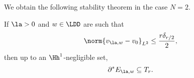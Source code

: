 We obtain the following stability theorem in the case $N=2$.


\begin{thm}
 If $\la>0$ and $w\in \LDD$ are such that
  $$
  \norm{v_{\la,w} - v_0}_{L^2}\leq \frac{r\delta_{r/2}}{2},
  $$
  then
up to an $\Hh^1$-negligible set,
\begin{equation}
  \partial^* E_{\la,w} \subseteq T_r.
\end{equation}

\end{thm}

